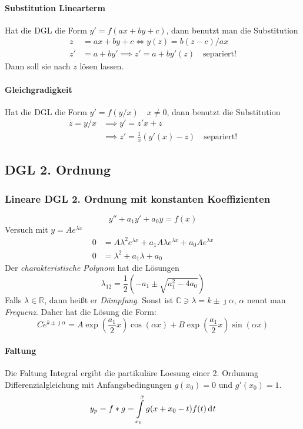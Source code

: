 \documentclass[margin=small, twocolumn]{hsrzf}
\numberwithin{equation}{subsection}
\begin{document}
\paragraph{Substitution Linearterm} Hat die DGL die Form \(y' = f(ax + by + c)\), dann benutzt man die Substitution
\begin{align*}
    z  &= ax + by + c \iff y(z) = b(z-c)/ax \\
    z' &= a + by' \implies z' = a + b y'(z) \quad\text{separiert!}
\end{align*}
Dann soll sie nach \(z\) l\"osen lassen.

\paragraph{Gleichgradigkeit} Hat die DGL die Form \(y' = f(y/x) \quad x \neq 0\), dann benutzt die Substitution
\begin{align*}
    z = y/x &\implies y' = z'x + z \\
    &\implies z' = \frac{1}{x}\left(y'(x) - z\right) \quad\text{separiert!}
\end{align*}


\subsection{DGL 2. Ordnung}

\subsubsection{Lineare DGL 2. Ordnung mit konstanten Koeffizienten}
\[
    y'' + a_1 y' + a_0 y = f(x)
\]
Versuch mit \(y = Ae^{\lambda x}\)
\begin{align*}
    0 &= A\lambda^2 e^{\lambda x} + a_1 A \lambda e^{\lambda x} + a_0 A e^{\lambda x} \\
    0 &= \lambda^2 + a_1\lambda + a_0
\end{align*}
Der \emph{charakteristische Polynom} hat die L\"osungen
\[
    \lambda_{12} = \frac{1}{2}\left(-a_1 \pm \sqrt{a_1^2 - 4a_0}\right)
\]
Falls \(\lambda \in \mathbb{R}\), dann hei{\ss}t er \emph{D\"ampfung}. Sonst ist \(\mathbb{C} \ni \lambda = k \pm\jmath\alpha\), \(\alpha\) nennt man \emph{Frequenz}. Daher hat die L\"osung die Form:
\[
    Ce^{k\pm\jmath\alpha} 
    = A\exp\left(\frac{a_1}{2}x\right)\cos(\alpha x)
    + B\exp\left(\frac{a_1}{2}x\right)\sin(\alpha x)
\]

\paragraph{Faltung}
Die Faltung Integral ergibt die partikul\"are Loesung einer 2. Ordunung Differenzialgleichung mit Anfangsbedingungen \(g(x_0) = 0\) und \(g'(x_0) = 1\).
\[
    y_p = f * g = \int\limits_{x_0}^x g(x + x_0 - t) f(t) \,\mathrm{d}^{} t
\]
\end{document}
